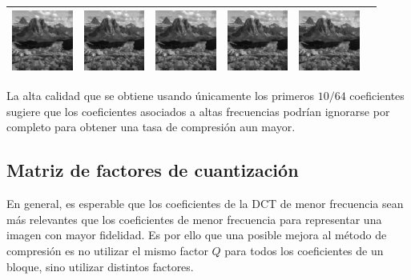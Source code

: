 \documentclass{article}
\begin{document}
\begin{center}
\begin{tabular}{|c|c|c|c|c|c|}
\includegraphics[width=2cm]{../imgs/output/test_progressive/out08.png} &
\includegraphics[width=2cm]{../imgs/output/test_progressive/out09.png} &
\includegraphics[width=2cm]{../imgs/output/test_progressive/out10.png} &
\includegraphics[width=2cm]{../imgs/output/test_progressive/out11.png} &
\includegraphics[width=2cm]{../imgs/output/test_progressive/out12.png} \\
\hline
\end{tabular}
\end{center}

La alta calidad que se obtiene usando únicamente los primeros $10/64$
coeficientes sugiere que los coeficientes asociados a altas frecuencias
podrían ignorarse por completo para obtener una tasa de compresión aun
mayor.

\subsection{Matriz de factores de cuantización}

En general, es esperable que los coeficientes de la DCT de menor frecuencia
sean más relevantes que los coeficientes de menor frecuencia
para representar una imagen con mayor fidelidad.
Es por ello que una posible mejora al método de compresión es no utilizar el
mismo factor $Q$ para todos los coeficientes de un bloque, sino utilizar
distintos factores.
\end{document}
